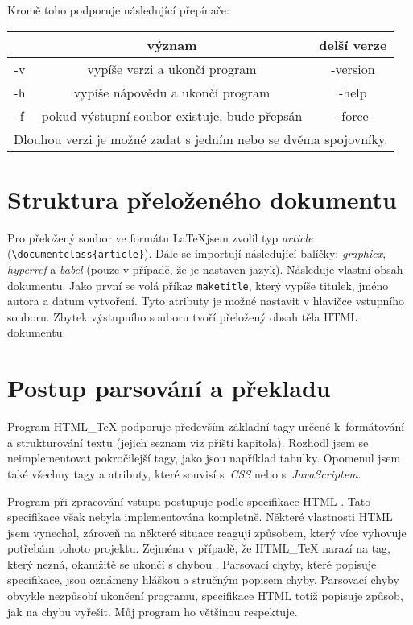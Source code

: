 \documentclass[a4paper,12pt]{article}
\newcommand{\zl}{\textbackslash}
\begin{document}
	Kromě toho podporuje následující přepínače:\\
	\begin{tabular}{|c|c|c|}
		\hline
		& \textbf{význam} & \textbf{delší verze} \\
		\hline
		-v       & vypíše verzi a ukončí program & -version \\
		\hline
		-h       & vypíše nápovědu a ukončí program & -help \\
		\hline
		-f       & pokud výstupní soubor existuje, bude přepsán & -force \\
		\hline
		\multicolumn{3}{c}{Dlouhou verzi je možné zadat s jedním nebo se dvěma spojovníky.}
	\end{tabular}
	
	\section{Struktura přeloženého dokumentu}
	Pro přeložený soubor ve formátu \LaTeX jsem zvolil typ \textit{article} (\texttt{\zl document\-class\{article\}}). Dále se importují následující balíčky: \textit{graphicx}, \textit{hyperref} a \textit{babel} (pouze v případě, že je nastaven jazyk). Následuje vlastní obsah dokumentu. Jako první se volá příkaz \texttt{maketitle}, který vypíše titulek, jméno autora a datum vytvoření. Tyto atributy je možné nastavit v hlavičce vstupního souboru. Zbytek výstupního souboru tvoří přeložený obsah těla HTML dokumentu.
	
	\section{Postup parsování a překladu}
	Program HTML\_TeX podporuje především základní tagy určené k~formá\-tování a strukturování textu (jejich seznam viz příští kapitola). Rozhodl jsem se
	neimplementovat pokročilejší tagy, jako jsou například tabulky. Opomenul jsem
	také všechny tagy a atributy, které souvisí s~\textit{CSS} nebo
	\mbox{s~\textit{JavaScriptem}}.

	Program při zpracování vstupu postupuje podle specifikace HTML \cite{specifikace}.
	Tato specifikace však nebyla implementována kompletně. Některé vlastnosti HTML jsem vynechal, zároveň na některé situace reaguji způsobem, který více vyhovuje potřebám tohoto projektu. Zejména v případě, že HTML\_TeX narazí na tag, který nezná, okamžitě se ukončí s chybou	\textit{}. Parsovací chyby, které popisuje specifikace, jsou oznámeny hláškou \textit{} a stručným popisem chyby. Parsovací chyby obvykle nezpůsobí ukončení programu, specifikace HTML totiž popisuje způsob, jak na chybu vyřešit. Můj program ho většinou respektuje.
	
\end{document}
